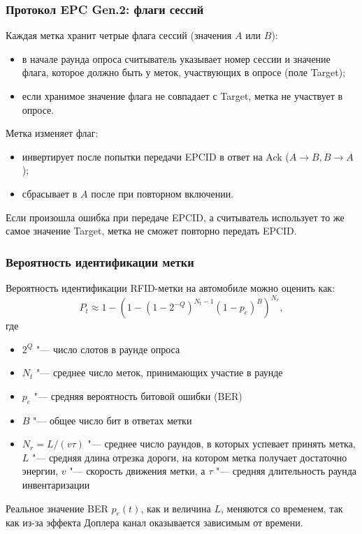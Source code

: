 \begin{frame}
    \frametitle{Протокол EPC Gen.2: флаги сессий}
    Каждая метка хранит четрые флага сессий (значения $A$ или $B$):
    \begin{itemize}
        \item в начале раунда опроса считыватель указывает номер сессии и значение флага, которое должно быть у меток, участвующих в опросе (поле Target);
        \item если хранимое значение флага не совпадает с Target, метка не участвует в опросе.
    \end{itemize}
    \vfill
    Метка изменяет флаг:
    \begin{itemize}
        \item инвертирует после попытки передачи EPCID в ответ на Ack ($A \rightarrow B, B \rightarrow A$);
        \item сбрасывает в $A$ после при повторном включении.
    \end{itemize}
    \vfill
    Если произошла ошибка при передаче EPCID, а считыватель использует то же самое значение Target, метка не сможет повторно передать EPCID.
\end{frame}

\begin{frame}
    \frametitle{Вероятность идентификации метки}
    Вероятность идентификации RFID-метки на автомобиле можно оценить как:
    \[
        P_t \approx 1 - \left( 1 - (1 - 2^{-Q})^{N_t-1} (1 - p_e)^B \right)^{N_r},
    \]
    где
    \begin{itemize}
        \item $2^Q$ "--- число слотов в раунде опроса
        \item $N_t$ "--- среднее число меток, принимающих участие в раунде
        \item $p_e$ "--- средняя вероятность битовой ошибки (BER)
        \item $B$ "--- общее число бит в ответах метки
        \item $N_r = L / (v \tau)$ "--- среднее число раундов, в которых успевает принять метка, $L$ "--- средняя длина отрезка дороги, на котором метка получает достаточно энергии, $v$ "--- скорость движения метки, а $\tau$ "--- средняя длительность раунда инвентаризации
    \end{itemize}
    Реальное значение BER $p_e(t)$, как и величина $L$, меняются со временем, так как из-за эффекта Доплера канал оказывается зависимым от времени.
\end{frame}


